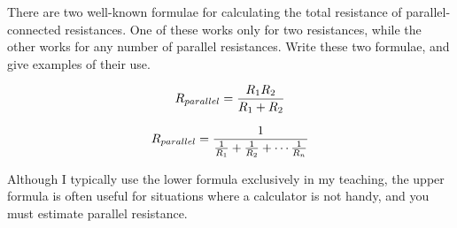 

There are two well-known formulae for calculating the total resistance of parallel-connected resistances.  One of these works only for two resistances, while the other works for any number of parallel resistances.  Write these two formulae, and give examples of their use.







$$R_{parallel} = {{R_1 R_2} \over {R_1 + R_2}}$$

$$R_{parallel} = {1 \over { {1 \over R_1} + {1 \over R_2} + \cdots {1 \over R_n} } }$$







Although I typically use the lower formula exclusively in my teaching, the upper formula is often useful for situations where a calculator is not handy, and you must estimate parallel resistance.




